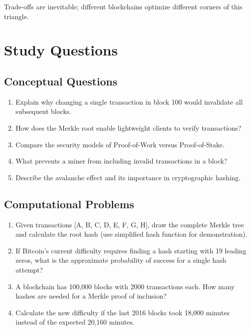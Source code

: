 \documentclass[11pt,a4paper]{article}
\begin{document}
Trade-offs are inevitable; different blockchains optimize different corners of this triangle.

\section{Study Questions}

\subsection{Conceptual Questions}

\begin{enumerate}
  \item Explain why changing a single transaction in block 100 would invalidate all subsequent blocks.
  \item How does the Merkle root enable lightweight clients to verify transactions?
  \item Compare the security models of Proof-of-Work versus Proof-of-Stake.
  \item What prevents a miner from including invalid transactions in a block?
  \item Describe the avalanche effect and its importance in cryptographic hashing.
\end{enumerate}

\subsection{Computational Problems}

\begin{enumerate}
  \item Given transactions [A, B, C, D, E, F, G, H], draw the complete Merkle tree and calculate the root hash (use simplified hash function for demonstration).

  \item If Bitcoin's current difficulty requires finding a hash starting with 19 leading zeros, what is the approximate probability of success for a single hash attempt?

  \item A blockchain has 100,000 blocks with 2000 transactions each. How many hashes are needed for a Merkle proof of inclusion?

  \item Calculate the new difficulty if the last 2016 blocks took 18,000 minutes instead of the expected 20,160 minutes.
\end{enumerate}
\end{document}
